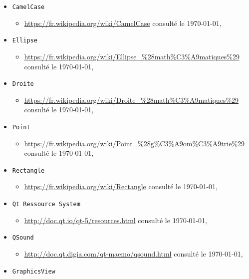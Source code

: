 \documentclass[a4paper,11pt]{report}
\begin{document}
\begin{itemize}
\begin{itemize}
		\end{itemize}
	\item[] \texttt{CamelCase} 
		\begin{itemize}
			\item \url{https://fr.wikipedia.org/wiki/CamelCase} consulté le \today,\\
		\end{itemize}
	\item[] \texttt{Ellipse}
		\begin{itemize}
			\item \url{https://fr.wikipedia.org/wiki/Ellipse_\%28math\%C3\%A9matiques\%29} consulté le \today,\\
		\end{itemize}
	\item[] \texttt{Droite}
		\begin{itemize}
			\item \url{https://fr.wikipedia.org/wiki/Droite_\%28math\%C3\%A9matiques\%29} consulté le \today,\\
		\end{itemize}
	\item[] \texttt{Point}
		\begin{itemize}
			\item \url{https://fr.wikipedia.org/wiki/Point_\%28g\%C3\%A9om\%C3\%A9trie\%29}
				consulté le \today,\\
		\end{itemize}
	\item[] \texttt{Rectangle}
		\begin{itemize}
			\item \url{https://fr.wikipedia.org/wiki/Rectangle} consulté le
				\today, \\
		\end{itemize}
	\item[]  \texttt{Qt Ressource System}
		\begin{itemize}
			\item \url{http://doc.qt.io/qt-5/resources.html} consulté le
				\today,\\
		\end{itemize}
	\item[] \texttt{QSound}
		\begin{itemize}
			\item \url{http://doc.qt.digia.com/qt-maemo/qsound.html} consulté le
				\today,\\
		\end{itemize}
	\item[] \texttt{GraphicsView}

\end{itemize}
\end{document}
